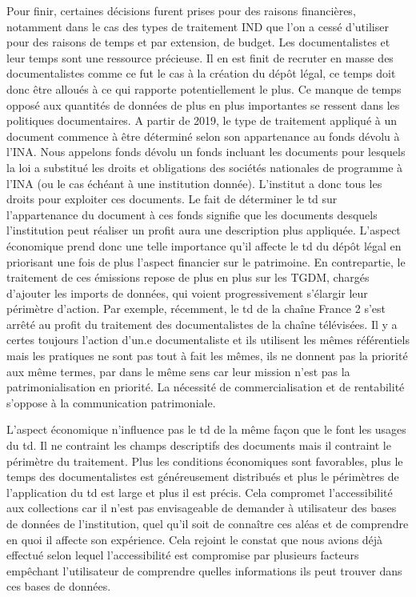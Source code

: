 Pour finir, certaines décisions furent prises pour des raisons financières, notamment dans le cas des types de traitement IND que l'on a cessé d'utiliser pour des raisons de temps et par extension, de budget. Les documentalistes et leur temps sont une ressource précieuse. Il en est finit de recruter en masse des documentalistes comme ce fut le cas à la création du dépôt légal, ce temps doit donc être alloués à ce qui rapporte potentiellement le plus. Ce manque de temps opposé aux quantités de données de plus en plus importantes se ressent dans les politiques documentaires. A partir de 2019, le type de traitement appliqué à un document commence à être déterminé selon son appartenance au fonds dévolu à l'INA. Nous appelons fonds dévolu un fonds incluant les documents pour lesquels la loi a substitué les droits et obligations des sociétés nationales de programme à l'INA (ou le cas échéant à une institution donnée). L'institut a donc tous les droits pour exploiter ces documents. Le fait de déterminer le \gls{td} sur l'appartenance du document à ces fonds signifie que les documents desquels l'institution peut réaliser un profit aura une description plus appliquée. L'aspect économique prend donc une telle importance qu'il affecte le \gls{td} du dépôt légal en priorisant une fois de plus l'aspect financier sur le patrimoine. En contrepartie, le traitement de ces émissions repose de plus en plus sur les TGDM, chargés d'ajouter les imports de données, qui voient progressivement s'élargir leur périmètre d'action. Par exemple, récemment, le \gls{td} de la chaîne France 2 s'est arrêté au profit du traitement des documentalistes de la chaîne télévisées. Il y a certes toujours l'action d'un.e documentaliste et ils utilisent les mêmes référentiels mais les pratiques ne sont pas tout à fait les mêmes, ils ne donnent pas la priorité aux même termes, par dans le même sens car leur mission n'est pas la patrimonialisation en priorité. La nécessité de commercialisation et de rentabilité s'oppose à la communication patrimoniale. 


L'aspect économique n'influence pas le \gls{td} de la même façon que le font les usages du \gls{td}. Il ne contraint les champs descriptifs des documents mais il contraint le périmètre du traitement. Plus les conditions économiques sont favorables, plus le temps des documentalistes est généreusement distribués et plus le périmètres de l'application du \gls{td} est large et plus il est précis. Cela compromet l'accessibilité aux collections car il n'est pas envisageable de demander à utilisateur des bases de données de l'institution, quel qu'il soit de connaître ces aléas et de comprendre en quoi il affecte son expérience. Cela rejoint le constat que nous avions déjà effectué selon lequel l'accessibilité est compromise par plusieurs facteurs empêchant l'utilisateur de comprendre quelles informations ils peut trouver dans ces bases de données. 